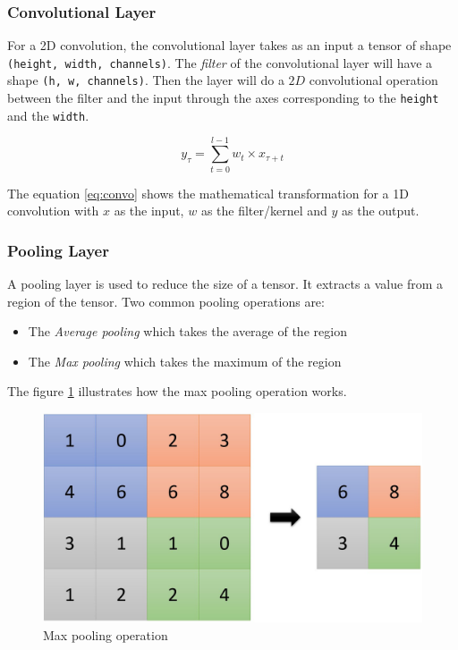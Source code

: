 \documentclass[12pt]{report}
\begin{document}
\subsubsection{Convolutional Layer}

For a 2D convolution, the convolutional layer takes as an input a tensor of shape \texttt{(height, width, channels)}.
The \textit{filter} of the convolutional layer will have a shape \texttt{(h, w, channels)}.
Then the layer will do a $2D$ convolutional operation between the filter and the input through the axes corresponding to the \texttt{height} and the \texttt{width}.

\begin{equation}
    y_{\tau} = \sum_{t=0}^{l-1} w_{t} \times x_{\tau + t}
    \label{eq:convo}
\end{equation}

The equation \ref{eq:convo} shows the mathematical transformation for a 1D convolution with $x$ as the input, $w$ as the filter/kernel and $y$ as the output.

\subsubsection{Pooling Layer}

A pooling layer is used to reduce the size of a tensor. It extracts a value from a region of the tensor. Two common pooling operations are:
\begin{itemize}
    \item The \textit{Average pooling} which takes the average of the region
    \item The \textit{Max pooling} which takes the maximum of the region
\end{itemize}
The figure \ref{fig:max_pooling} illustrates how the max pooling operation works.

\begin{figure}[H]
    \centering
    \includegraphics[width=0.75 \textwidth]{images/nn/layers/max_pooling.jpg}
    \caption{Max pooling operation}
    \label{fig:max_pooling}
\end{figure}
\end{document}
